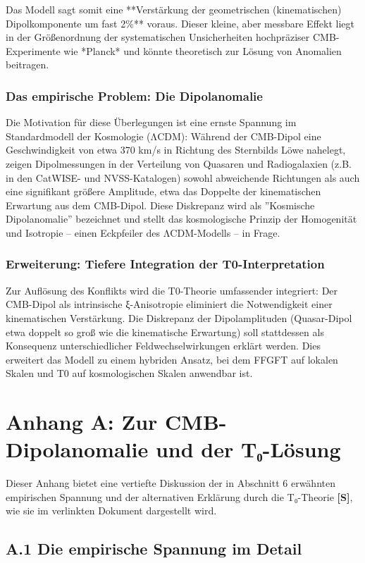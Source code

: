 Das Modell sagt somit eine **Verstärkung der geometrischen (kinematischen) Dipolkomponente um fast 2\%** voraus. Dieser kleine, aber messbare Effekt liegt in der Größenordnung der systematischen Unsicherheiten hochpräziser CMB-Experimente wie *Planck* und könnte theoretisch zur Lösung von Anomalien beitragen.

\subsubsection*{Das empirische Problem: Die Dipolanomalie}

Die Motivation für diese Überlegungen ist eine ernste Spannung im Standardmodell der Kosmologie (ΛCDM): Während der CMB-Dipol eine Geschwindigkeit von etwa 370 km/s in Richtung des Sternbilds Löwe nahelegt, zeigen Dipolmessungen in der Verteilung von Quasaren und Radiogalaxien (z.B. in den CatWISE- und NVSS-Katalogen) sowohl abweichende Richtungen als auch eine signifikant größere Amplitude, etwa das Doppelte der kinematischen Erwartung aus dem CMB-Dipol. Diese Diskrepanz wird als ''Kosmische Dipolanomalie'' bezeichnet und stellt das kosmologische Prinzip der Homogenität und Isotropie – einen Eckpfeiler des ΛCDM-Modells – in Frage.

\subsubsection*{Erweiterung: Tiefere Integration der T0-Interpretation}
Zur Auflösung des Konflikts wird die T0-Theorie umfassender integriert: Der CMB-Dipol als intrinsische ξ-Anisotropie eliminiert die Notwendigkeit einer kinematischen Verstärkung. Die Diskrepanz der Dipolamplituden (Quasar-Dipol etwa doppelt so groß wie die kinematische Erwartung) soll stattdessen als Konsequenz unterschiedlicher Feldwechselwirkungen erklärt werden. Dies erweitert das Modell zu einem hybriden Ansatz, bei dem FFGFT auf lokalen Skalen und T0 auf kosmologischen Skalen anwendbar ist.

\section*{Anhang A: Zur CMB-Dipolanomalie und der T₀-Lösung}

Dieser Anhang bietet eine vertiefte Diskussion der in Abschnitt 6 erwähnten empirischen Spannung und der alternativen Erklärung durch die T₀-Theorie \textbf{[S]}, wie sie im verlinkten Dokument dargestellt wird.

\subsection*{A.1 Die empirische Spannung im Detail}

